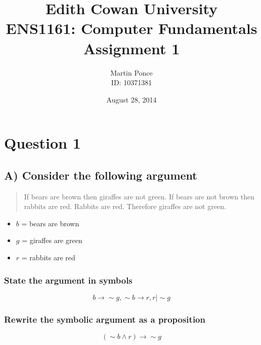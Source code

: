 \documentclass[12pt,a4paper]{article}
\title{Edith Cowan University\\ENS1161: Computer Fundamentals\\Assignment 1}
\author{Martin Ponce\\ID: 10371381}
\date{August 28, 2014}
\begin{document}


\newpage
\null  %
\nointerlineskip  %
\vfill
\let\snewpage \newpage
\let\newpage \relax
\maketitle
\thispagestyle{empty}
\let \newpage \snewpage
\vfill

\newpage
\tableofcontents

\newpage
\section{Question 1}

\subsection{A) Consider the following argument}
\begin{quote}
If bears are brown then giraffes are not green. If bears are not brown then rabbits are red. Rabbits are red. Therefore giraffes are not green.
\end{quote}

\begin{itemize}
\item $b$ = bears are brown
\item $g$ = giraffes are green
\item $r$ = rabbits are red
\end{itemize}

\subsubsection{State the argument in symbols}
$$b \rightarrow \sim{g}, \sim{b} \rightarrow r, r \mid \sim{g}$$

\subsubsection{Rewrite the symbolic argument as a proposition}
$$(\sim{b} \wedge r) \rightarrow \sim{g}$$
\end{document}
